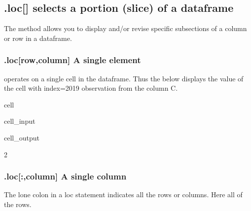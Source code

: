 \documentclass[letterpaper,10pt,english]{jupyterBook}
\begin{document}
\subsection{.loc{[}{]} selects a portion (slice) of a dataframe}
\label{\detokenize{content/04_PythonEssentials/PythonPackagesEtc:loc-selects-a-portion-slice-of-a-dataframe}}
\sphinxAtStartPar
The  method allows you to display and/or revise specific sub\sphinxhyphen{}sections of a column or row in a dataframe.


\subsubsection{.loc{[}row,column{]} A single element}
\label{\detokenize{content/04_PythonEssentials/PythonPackagesEtc:loc-row-column-a-single-element}}
\sphinxAtStartPar
{} operates on a single cell in the dataframe.  Thus the below displays the value of the cell with index=2019 observation from the  column C.

\begin{sphinxuseclass}{cell}\begin{sphinxVerbatimInput}

\begin{sphinxuseclass}{cell_input}
\begin{sphinxVerbatim}[commandchars=\\\{\}]
\PYG{p}{[}\PYG{p}{]}
\end{sphinxVerbatim}

\end{sphinxuseclass}\end{sphinxVerbatimInput}
\begin{sphinxVerbatimOutput}

\begin{sphinxuseclass}{cell_output}
\begin{sphinxVerbatim}[commandchars=\\\{\}]
2
\end{sphinxVerbatim}

\end{sphinxuseclass}\end{sphinxVerbatimOutput}

\end{sphinxuseclass}

\subsubsection{.loc{[}:,column{]} A single column}
\label{\detokenize{content/04_PythonEssentials/PythonPackagesEtc:loc-column-a-single-column}}
\sphinxAtStartPar
The lone colon in a loc statement indicates all the rows or columns.  Here all of the rows.
\end{document}
